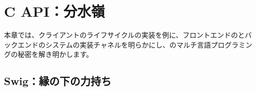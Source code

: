 \begin{savequote}[45mm]
\end{savequote}

\chapter{C API：分水嶺} 
\label{ch:c-api}

\begin{content}

本章では、クライアントのライフサイクルの実装を例に、フロントエンドのとバックエンドの\cpp{}システムの実装チャネルを明らかにし、のマルチ言語プログラミングの秘密を解き明かします。

\end{content}

\section{Swig：縁の下の力持ち}

